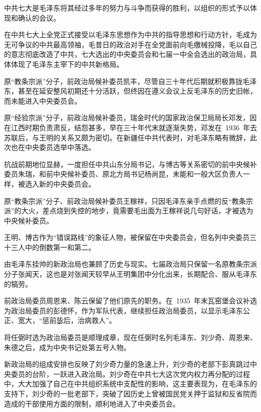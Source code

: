 中共七大是毛泽东将其经过多年的努力与斗争而获得的胜利，以组织的形式予以体现和确认的会议。

在中共七大上全党正式接受以毛泽东思想作为中共的指导思想和行动方针，毛成为无可争议的中共最高领袖，毛昔日的政治对手在全党面前向毛缴械投降，毛以自己的意志彻底改造了中共，七大选出的中央委员会和七届一中全会选出的政治局，具体体现了毛泽东主宰下的中共新格局。

原“教条宗派”分子，前政治局候补委员凯丰，尽管自三十年代后期就积极靠拢毛泽东，甚至在延安整风初期还十分活跃，但终因在遵义会议上反毛泽东的历史旧帐，而未能进入中央委员会。

原“经验宗派”分子，前政治局候补委员，瑞金时代的国家政治保卫局局长邓发，因在江西时期负责肃反，结怨甚多，早在三十年代末就逐渐失势，邓发在~1936~年去苏联后，与王明的关系又颇为密切。在新疆任中共代表时，对毛泽东略有微辞，此次也在中央委员选举中落选。

抗战前期地位显赫，一度担任中共山东分局书记，与博古等关系密切的前中央候补委员朱瑞，和前中央候补委员、原北方局书记杨尚昆，未能和一般大区负责人一样，被选入新的中央委员会。

原“教条宗派”分子、前政治局候补委员王稼祥，只因毛泽东亲手点燃的反“教条宗派”的大火，差点烧到失控的地步，竟需要毛出面为王稼祥说几句好话，才被选为中央候补委员。

王明、博古作为“错误路线”的象征人物，被保留在中央委员会，但名列中央委员三十三人中的倒数第一和第二。

由毛泽东挂帅的新政治局也兼顾了历史与现实。七届政治局只保留一名原教条宗派分子张闻天，这也是对张闻天较早从王明集团中分化出来，长期配合、服从毛泽东的犒劳。

前政治局委员周恩来、陈云保留了他们原先的职务。在~1935~年末瓦窑堡会议补选为政治局委员的彭德怀，作为军队代表，继续担任政治局委员，以显示毛泽东公正、宽大，“惩前毖后，治病救人”。

将任弼时选为政治局委员是顺理成章，现在任弼时名列毛泽东、刘少奇、周恩来、朱德之后，成为中央书记处第五号人物。

新政治局的组成安排也反映了刘少奇力量的急速上升，刘少奇的老部下彭真跳过中央委员的台阶，一跃进入政治局。刘少奇在中共七大这次党内权力再分配的过程中，大大加强了自己在中共组织系统中支配性的影响，这主要表现为，在毛泽东的支持下，刘少奇的一批老部下，突破了因历史上曾被国民党关押于监狱和反省院而造成的干部使用方面的限制，顺利地进入了中央委员会。

